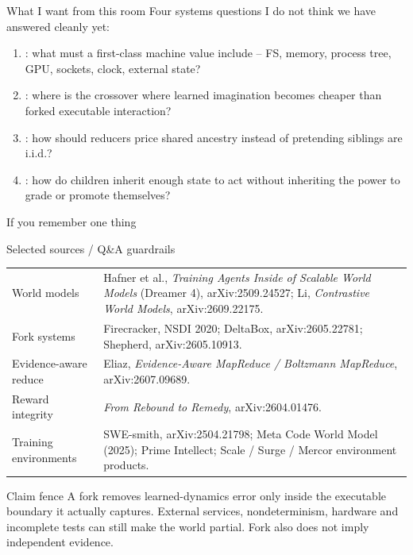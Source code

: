 \begin{frame}{What I want from this room}
\large
Four systems questions I do not think we have answered cleanly yet:

\vspace{0.4em}
\begin{enumerate}
  \item {}: what must a first-class machine value include -- FS, memory, process tree, GPU, sockets, clock, external state?
  \item {}: where is the crossover where learned imagination becomes cheaper than forked executable interaction?
  \item {}: how should reducers price shared ancestry instead of pretending siblings are i.i.d.?
  \item {}: how do children inherit enough state to act without inheriting the power to grade or promote themselves?
\end{enumerate}

\vspace{0.65em}
\begin{block}{If you remember one thing}
\centering\Large {}
\end{block}
\end{frame}

\appendix
\begin{frame}{Selected sources / Q\&A guardrails}
\footnotesize
\begin{tabular}{p{}p{}}
\toprule
World models & Hafner et al., \textit{Training Agents Inside of Scalable World Models} (Dreamer 4), arXiv:2509.24527; Li, \textit{Contrastive World Models}, arXiv:2609.22175. \\
Fork systems & Firecracker, NSDI 2020; DeltaBox, arXiv:2605.22781; Shepherd, arXiv:2605.10913. \\
Evidence-aware reduce & Eliaz, \textit{Evidence-Aware MapReduce / Boltzmann MapReduce}, arXiv:2607.09689. \\
Reward integrity & \textit{From Rebound to Remedy}, arXiv:2604.01476. \\
Training environments & SWE-smith, arXiv:2504.21798; Meta Code World Model (2025); Prime Intellect; Scale / Surge / Mercor environment products. \\
\bottomrule
\end{tabular}

\vspace{0.65em}
\begin{block}{Claim fence}
A fork removes learned-dynamics error only inside the executable boundary it actually captures. External services, nondeterminism, hardware and incomplete tests can still make the world partial. Fork also does not imply independent evidence.
\end{block}
\end{frame}

